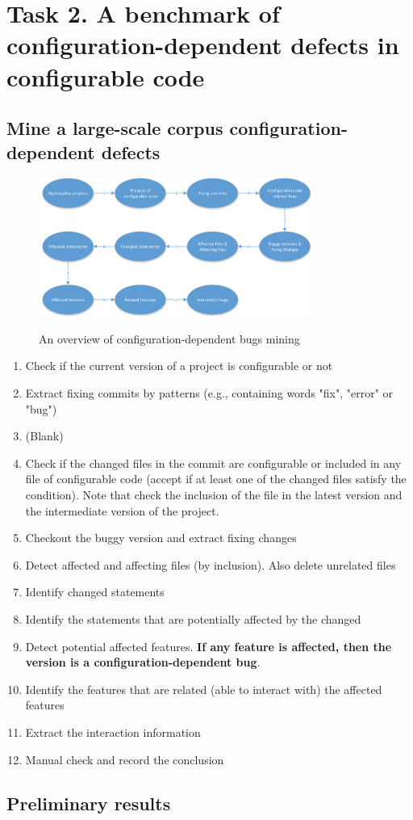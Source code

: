 \section{Task 2. A benchmark of configuration-dependent defects in configurable code}
\label{task2-section}

\subsection{Mine a large-scale corpus configuration-dependent defects}
\begin{figure}[h]
\centering
\includegraphics[width=0.8\textwidth]{benchmark}
\label{workflow}
\caption{An overview of configuration-dependent bugs mining}
\end{figure}
\begin{enumerate}
	\item Check if the current version of a project is configurable or not
	\item Extract fixing commits by patterns (e.g., containing words "fix", "error" or "bug")
	\item (Blank)
	\item Check if the changed files in the commit are configurable or included in any file of configurable code (accept if at least one of the changed files satisfy the condition). Note that check the inclusion of the file in the latest version and the intermediate version of the project.
	\item Checkout the buggy version and extract fixing changes
	\item Detect affected and affecting files (by inclusion). Also delete unrelated files
	\item Identify changed statements
	\item Identify the statements that are potentially affected by the changed
	\item Detect potential affected features. \textbf{If any feature is affected, then the version is a configuration-dependent bug}.
	\item Identify the features that are related (able to interact with) the affected features
	\item Extract the interaction information
	\item Manual check and record the conclusion
\end{enumerate}

\subsection{Preliminary results }